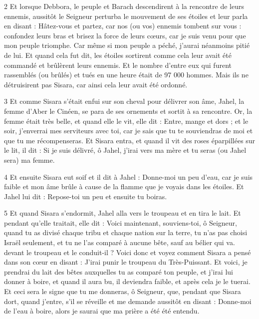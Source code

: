 \par 2 Et lorsque Debbora, le peuple et Barach descendirent à la rencontre de leurs ennemis, aussitôt le Seigneur perturba le mouvement de ses étoiles et leur parla en disant : Hâtez-vous et partez, car nos (ou vos) ennemis tombent sur vous : confondez leurs bras et brisez la force de leurs cœurs, car je suis venu pour que mon peuple triomphe. Car même si mon peuple a péché, j'aurai néanmoins pitié de lui. Et quand cela fut dit, les étoiles sortirent comme cela leur avait été commandé et brûlèrent leurs ennemis. Et le nombre d'entre eux qui furent rassemblés (ou brûlés) et tués en une heure était de 97 000 hommes. Mais ils ne détruisirent pas Sisara, car ainsi cela leur avait été ordonné.

\par 3 Et comme Sisara s'était enfui sur son cheval pour délivrer son âme, Jahel, la femme d'Aber le Cinéen, se para de ses ornements et sortit à sa rencontre. Or, la femme était très belle, et quand elle le vit, elle dit : Entre, mange et dors ; et le soir, j'enverrai mes serviteurs avec toi, car je sais que tu te souviendras de moi et que tu me récompenseras. Et Sisara entra, et quand il vit des roses éparpillées sur le lit, il dit : Si je suis délivré, ô Jahel, j'irai vers ma mère et tu seras (ou Jahel sera) ma femme.

\par 4 Et ensuite Sisara eut soif et il dit à Jahel : Donne-moi un peu d'eau, car je suis faible et mon âme brûle à cause de la flamme que je voyais dans les étoiles. Et Jahel lui dit : Repose-toi un peu et ensuite tu boiras.

\par 5 Et quand Sisara s'endormit, Jahel alla vers le troupeau et en tira le lait. Et pendant qu'elle traitait, elle dit : Voici maintenant, souviens-toi, ô Seigneur, quand tu as divisé chaque tribu et chaque nation sur la terre, tu n'as pas choisi Israël seulement, et tu ne l'as comparé à aucune bête, sauf au bélier qui va. devant le troupeau et le conduit-il ? Voici donc et voyez comment Sisara a pensé dans son cœur en disant : J'irai punir le troupeau du Très-Puissant. Et voici, je prendrai du lait des bêtes auxquelles tu as comparé ton peuple, et j'irai lui donner à boire, et quand il aura bu, il deviendra faible, et après cela je le tuerai. Et ceci sera le signe que tu me donneras, ô Seigneur, que, pendant que Sisara dort, quand j'entre, s'il se réveille et me demande aussitôt en disant : Donne-moi de l'eau à boire, alors je saurai que ma prière a été été entendu.

